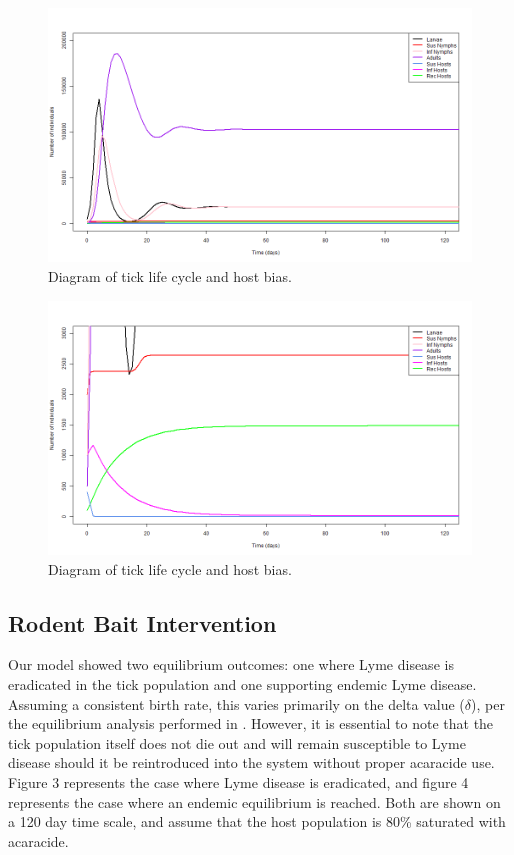 \documentclass[12pt, centerh1]{article}
\begin{document}
\begin{figure}[h]
    \centering
    \includegraphics[scale = 0.15]{figures/base_large.png}
    \caption{Diagram of tick life cycle and host bias.}
    \label{fig:base_large}
\end{figure}

\begin{figure}[h]
    \centering
    \includegraphics[scale = 0.15]{figures/base_small.png}
    \caption{Diagram of tick life cycle and host bias.}
    \label{fig:base_small}
\end{figure}

\subsection{Rodent Bait Intervention}
Our model showed two equilibrium outcomes: one where Lyme disease is eradicated in the tick population and one supporting endemic Lyme disease. Assuming a consistent birth rate, this varies primarily on the delta value ($\delta$), per the equilibrium analysis performed in \cite{tosato2021host}. However, it is essential to note that the tick population itself does not die out and will remain susceptible to Lyme disease should it be reintroduced into the system without proper acaracide use. Figure 3 represents the case where Lyme disease is eradicated, and figure 4 represents the case where an endemic equilibrium is reached. Both are shown on a 120 day time scale, and assume that the host population is 80\% saturated with acaracide.
\end{document}
